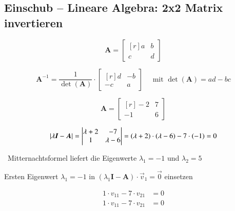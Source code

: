 \subsection{Einschub -- Lineare Algebra: 2x2 Matrix invertieren}

\begin{minipage}[b]{0.33\columnwidth}
    $$ \bm{A} = 
    \begin{bmatrix*}[r]
        a & b \\
        c & d 
    \end{bmatrix*} $$
\end{minipage}
\hfill
\begin{minipage}[b]{0.66\columnwidth}
    $$ \bm{A}^{-1} = \frac{1}{\det(\bm{A})} \cdot 
    \begin{bmatrix*}[r]
        d & -b \\
        -c & a 
    \end{bmatrix*} \quad \text{ mit } \det(\bm{A}) = ad - bc $$
\end{minipage}



\begin{minipage}[c]{0.25\columnwidth}
    $$ \bm{A} = \begin{bmatrix*}[r]
        -2 & 7 \\
        -1 & 6 
    \end{bmatrix*}$$ 
\end{minipage}
\hfill
\begin{minipage}[c]{0.72\columnwidth}
    $$ \abs{\lambda \bm{I} - \bm{A}} = \begin{vmatrix*}[c]
        \lambda + 2 & -7 \\
        1 & \lambda - 6 
    \end{vmatrix*} = (\lambda + 2) \cdot (\lambda - 6) - 7 \cdot (-1) = 0 $$
\end{minipage}

\textrightarrow\ Mitternachtsformel liefert die Eigenwerte $\lambda_1 = -1$ und $\lambda_2 = 5$

\begin{minipage}[t]{0.56\columnwidth}
    Ersten Eigenwert $\lambda_1 = -1$ in $(\lambda_1 \bm{I} - \bm{A}) \cdot \vec{v}_1 = \vec{0}$ einsetzen
\end{minipage}
\hfill
\begin{minipage}[c]{0.4\columnwidth}
    \begin{align*}
        1 \cdot v_{11} - 7 \cdot v_{21} &= 0 \\
        1 \cdot v_{11} - 7 \cdot v_{21} &= 0 
    \end{align*}
\end{minipage}

